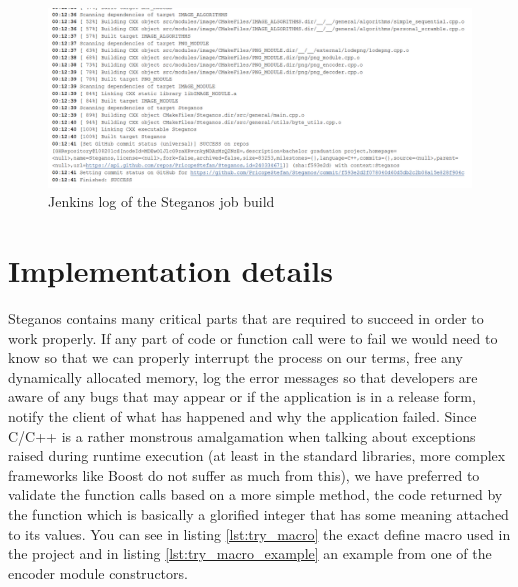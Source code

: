 \begin{figure}[H]
    \centering
    \includegraphics[width=15cm,keepaspectratio]{pics/application_chapter/jenkins_project_build}
    \caption{Jenkins log of the Steganos job build}
    \label{jenkins-log}
\end{figure}



\section{Implementation details}
Steganos contains many critical parts that are required to succeed in order to work properly. If any part of code or function call were to fail we would need to know so that we can properly interrupt the process on our terms, free any dynamically allocated memory, log the error messages so that developers are aware of any bugs that may appear or if the application is in a release form, notify the client of what has happened and why the application failed. Since C/C++ is a rather monstrous amalgamation when talking about exceptions raised during runtime execution (at least in the standard libraries, more complex frameworks like Boost do not suffer as much from this), we have preferred to validate the function calls based on a more simple method, the code returned by the function which is basically a glorified integer that has some meaning attached to its values. You can see in listing \ref{lst:try_macro} the exact define macro used in the project and in listing \ref{lst:try_macro_example} an example from one of the encoder module constructors.

